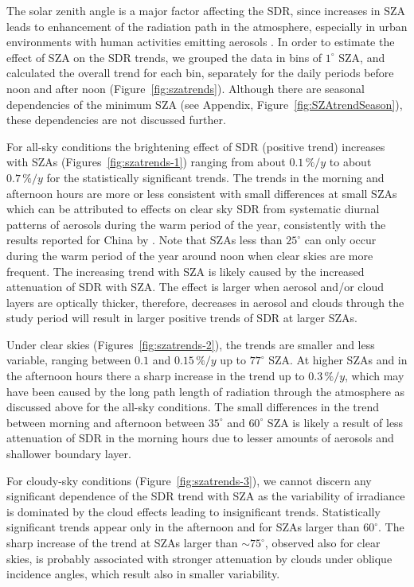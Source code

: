 \documentclass[applsci,article,submit,moreauthors,pdftex]{Definitions/mdpi}
\begin{document}
The solar zenith angle is a major factor affecting the SDR, since
increases in SZA leads to enhancement of the radiation path in the
atmosphere, especially in urban environments with human activities
emitting aerosols \citep{Wang2021}. In order to estimate the effect of
SZA on the SDR trends, we grouped the data in bins of \(1^\circ\) SZA,
and calculated the overall trend for each bin, separately for the daily
periods before noon and after noon (Figure~\ref{fig:szatrends}).
Although there are seasonal dependencies of the minimum SZA (see
Appendix, Figure~\ref{fig:SZAtrendSeason}), these dependencies are not
discussed further.

For all-sky conditions the brightening effect of SDR (positive trend)
increases with SZAs (Figures~\ref{fig:szatrends-1}) ranging from about
\(0.1\,\%/y\) to about \(0.7\,\%/y\) for the statistically significant
trends. The trends in the morning and afternoon hours are more or less
consistent with small differences at small SZAs which can be attributed
to effects on clear sky SDR from systematic diurnal patterns of aerosols
during the warm period of the year, consistently with the results
reported for China by \citet{Wang2021}. Note that SZAs less than
\(25^\circ\) can only occur during the warm period of the year around
noon when clear skies are more frequent. The increasing trend with SZA
is likely caused by the increased attenuation of SDR with SZA. The
effect is larger when aerosol and/or cloud layers are optically thicker,
therefore, decreases in aerosol and clouds through the study period will
result in larger positive trends of SDR at larger SZAs.

Under clear skies (Figures~\ref{fig:szatrends-2}), the trends are
smaller and less variable, ranging between \(0.1\) and \(0.15\,\%/y\) up
to \(77^\circ\) SZA. At higher SZAs and in the afternoon hours there a
sharp increase in the trend up to \(0.3\,\%/y\), which may have been
caused by the long path length of radiation through the atmosphere as
discussed above for the all-sky conditions. The small differences in the
trend between morning and afternoon between \(35^\circ\) and
\(60^\circ\) SZA is likely a result of less attenuation of SDR in the
morning hours due to lesser amounts of aerosols and shallower boundary
layer.

For cloudy-sky conditions (Figure~\ref{fig:szatrends-3}), we cannot
discern any significant dependence of the SDR trend with SZA as the
variability of irradiance is dominated by the cloud effects leading to
insignificant trends. Statistically significant trends appear only in
the afternoon and for SZAs larger than \(60^\circ\). The sharp increase
of the trend at SZAs larger than \(\sim{75}^{\circ}\), observed also for
clear skies, is probably associated with stronger attenuation by clouds
under oblique incidence angles, which result also in smaller
variability.
\end{document}
